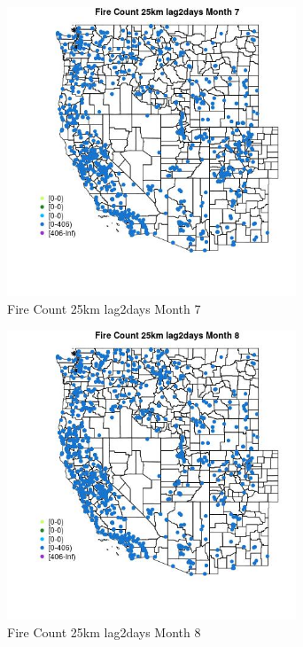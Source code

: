 \begin{figure} 
\centering  
\includegraphics[width=0.77\textwidth]{Code_Outputs/Report_ML_input_PM25_Step4_part_f_de_duplicated_aveswNAs_MapObsMo7Fire_Count_25km_lag2days.jpg} 
\caption{\label{fig:Report_ML_input_PM25_Step4_part_f_de_duplicated_aveswNAsMapObsMo7Fire_Count_25km_lag2days}Fire Count 25km lag2days Month 7} 
\end{figure} 
 

\begin{figure} 
\centering  
\includegraphics[width=0.77\textwidth]{Code_Outputs/Report_ML_input_PM25_Step4_part_f_de_duplicated_aveswNAs_MapObsMo8Fire_Count_25km_lag2days.jpg} 
\caption{\label{fig:Report_ML_input_PM25_Step4_part_f_de_duplicated_aveswNAsMapObsMo8Fire_Count_25km_lag2days}Fire Count 25km lag2days Month 8} 
\end{figure} 
 

